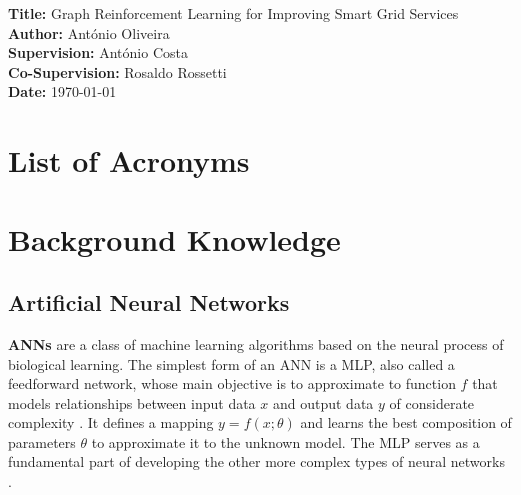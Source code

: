 \documentclass[11pt,a4paper]{article}
\newcommand{\titles}[2]{\noindent\textbf{#1:} #2\\[2mm]}
\begin{document}
\begin{comment}
    * Graph Reinforcement Learning Techniques for Improving Smart Grid Services
    * Leveraging 
\end{comment}
\titles{Title}{Graph Reinforcement Learning for Improving Smart Grid Services}
\titles{Author}{António Oliveira}
\titles{Supervision}{António Costa}
\titles{Co-Supervision}{Rosaldo Rossetti}
\titles{Date}{\today}

\section{List of Acronyms}
\begin{acronym}
\end{acronym}


\begin{comment}
    * $s, s'$ - states
    * $a$ - action
    * $r$ - reward
    * $\mathcal{S}$ - set of all nonterminal states
    * $\mathcal{S}^+$ - set of all states (including terminal state)
    * $\mathcal{A}(s)$ - set of actions available under state $s$
    * $\mathcal{R}$ - set of all possible rewards, a finite subset of \mathbb{R}
    * $\doteq$ - definition
\end{comment}

\section{Background Knowledge}

\subsection{Artificial Neural Networks}

\textbf{\acp{ANN}} are a class of machine learning algorithms based on the neural process of biological learning. The simplest form of an \ac{ANN} is a \ac{MLP}, also called a feedforward network, whose main objective is to approximate to function $f$ that models relationships between input data $x$ and output data $y$ of considerate complexity \cite{charniakIntroductionDeepLearning2018, goodfellowDeepLearning2016}. It defines a mapping $y=f(x;\theta)$ and learns the best composition of parameters $\theta$ to approximate it to the unknown model. The \ac{MLP} serves as a fundamental part of developing the other more complex types of neural networks \cite{charniakIntroductionDeepLearning2018}. \par
\end{document}
